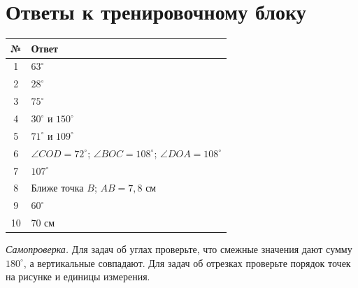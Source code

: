 \documentclass[a4paper,12pt]{article}
\newcommand{\headingrule}{\vspace{-0.45em}{\color{accent}\hrule height 0.55pt}\vspace{0.55em}}
\begin{document}
\section*{Ответы к тренировочному блоку}
\headingrule
\begin{center}
\renewcommand{\arraystretch}{1.55}
\begin{tabularx}{0.92\linewidth}{@{}c X@{}}
\toprule
\textbf{№} & \textbf{Ответ}\\
\midrule
1 & $63^\circ$\\
2 & $28^\circ$\\
3 & $75^\circ$\\
4 & $30^\circ$ и $150^\circ$\\
5 & $71^\circ$ и $109^\circ$\\
6 & $\angle COD=72^\circ$; $\angle BOC=108^\circ$; $\angle DOA=108^\circ$\\
7 & $107^\circ$\\
8 & Ближе точка $B$; $AB=7{,}8$ см\\
9 & $60^\circ$\\
10 & $70$ см\\
\bottomrule
\end{tabularx}
\end{center}
\vspace{1.2em}
\textit{Самопроверка.} Для задач об углах проверьте, что смежные значения дают сумму $180^\circ$, а вертикальные совпадают. Для задач об отрезках проверьте порядок точек на рисунке и единицы измерения.
\end{document}
